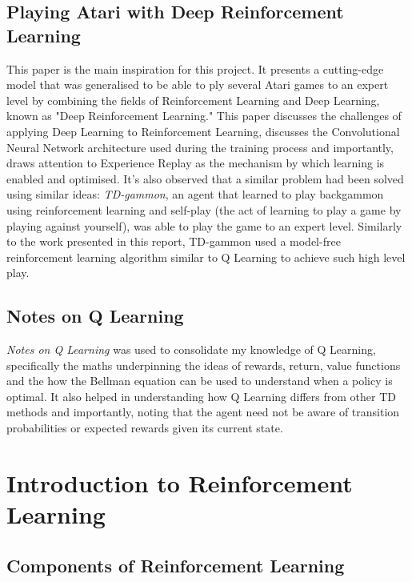 \documentclass{article}
\begin{document}
\subsection{Playing Atari with Deep Reinforcement Learning}

This paper\cite{mnih2013atari} is the main inspiration for this project. It presents a cutting-edge model that was generalised to be able to ply several Atari games to an expert level by combining the fields of Reinforcement Learning and Deep Learning, known as "Deep Reinforcement Learning." This paper discusses the challenges of applying Deep Learning to Reinforcement Learning, discusses the Convolutional Neural Network architecture used during the training process and importantly, draws attention to Experience Replay as the mechanism by which learning is enabled and optimised. It's also observed that a similar problem had been solved using similar ideas: \textit{TD-gammon}, an agent that learned to play backgammon using reinforcement learning and self-play (the act of learning to play a game by playing against yourself), was able to play the game to an expert level. Similarly to the work presented in this report, TD-gammon used a model-free reinforcement learning algorithm similar to Q Learning to achieve such high level play.

\subsection{Notes on Q Learning}

\textit{Notes on Q Learning}\cite{RLNotes} was used to consolidate my knowledge of Q Learning, specifically the maths underpinning the ideas of rewards, return, value functions and the how the Bellman equation can be used to understand when a policy is optimal. It also helped in understanding how Q Learning differs from other TD methods and importantly, noting that the agent need not be aware of transition probabilities or expected rewards given its current state. 

\section{Introduction to Reinforcement Learning}



\subsection{Components of Reinforcement Learning}
\end{document}
